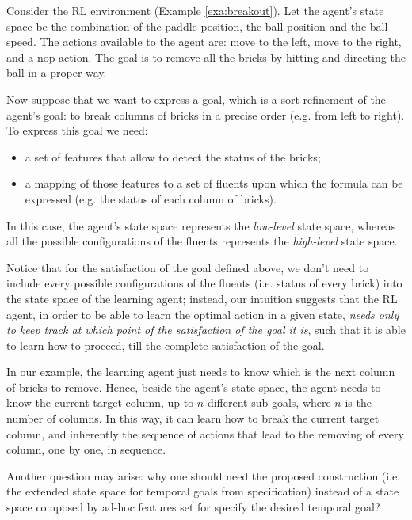 \begin{example}
	Consider the RL environment \Breakout (Example \ref{exa:breakout}). Let the agent's state space be the combination of the paddle position, the ball position and the ball speed. The actions available to the agent are: move to the left, move to the right, and a nop-action. The goal is to remove all the bricks by hitting and directing the ball in a proper way.
	
	Now suppose that we want to express a \LLf goal, which is a sort refinement of the agent's goal: to break columns of bricks in a precise order (e.g. from left to right). To express this goal we need:
	\begin{itemize}
		\item a set of features that allow to detect the status of the bricks;
		\item a mapping of those features to a set of fluents upon which the \LLf formula can be expressed (e.g. the status of each column of bricks).
	\end{itemize}
	In this case, the agent's state space represents the \emph{low-level} state space, whereas all the possible configurations of the fluents represents the \emph{high-level} state space.
	
	Notice that for the satisfaction of the \LLf goal defined above, we don't need to include every possible configurations of the fluents (i.e. status of every brick) into the state space of the learning agent; instead, our intuition suggests that the RL agent, in order to be able to learn the optimal action in a given state, \emph{needs only to keep track at which point of the satisfaction of the goal it is}, such that it is able to learn how to proceed, till the complete satisfaction of the goal.
	
	In our example, the learning agent just needs to know which is the next column of bricks to remove. Hence, beside the agent's state space, the agent needs to know the current target column, up to $n$ different sub-goals, where $n$ is the number of columns. In this way, it can learn how to break the current target column, and inherently the sequence of actions that lead to the removing of every column, one by one, in sequence.
	
	Another question may arise: why one should need the proposed construction (i.e. the extended state space for temporal goals from \LLf specification) instead of a state space composed by ad-hoc features set for specify the desired temporal goal?
	

\end{example}
